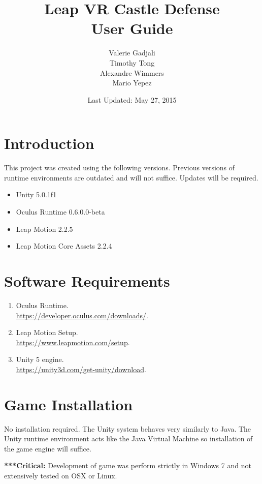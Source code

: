 \documentclass[a4paper]{refart}
\title{Leap VR Castle Defense\\User Guide}
\author{Valerie Gadjali\\
	Timothy Tong\\
	Alexandre Wimmers\\
	Mario Yepez
}
\date{Last Updated: May 27, 2015}
\begin{document}
\maketitle

\tableofcontents

\newpage

\section{Introduction}

This project was created using the following versions. Previous versions of runtime environments are outdated and will not suffice. Updates will be required.

\begin{itemize}
	\item Unity 5.0.1f1
	\item Oculus Runtime 0.6.0.0-beta
	\item Leap Motion 2.2.5
	\item Leap Motion Core Assets 2.2.4
\end{itemize}

\section{Software Requirements}

\begin{enumerate}
	\item Oculus Runtime.\\ \url{https://developer.oculus.com/downloads/}.
	\item Leap Motion Setup.\\ \url{https://www.leapmotion.com/setup}.
	\item Unity 5 engine.\\ \url{https://unity3d.com/get-unity/download}.
\end{enumerate}

\pagebreak

\section{Game Installation}

No installation required. The Unity system behaves very similarly to Java. The Unity runtime environment acts like the Java Virtual Machine so installation of the game engine will suffice. 

\textbf{***Critical:} Development of game was perform strictly in Windows 7 and not extensively tested on OSX or Linux.
\end{document}
